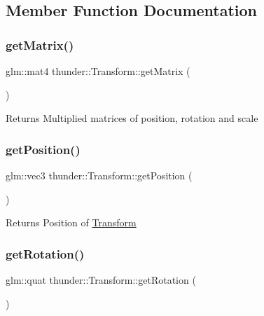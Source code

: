 \subsection{Member Function Documentation}
\mbox{\label{classthunder_1_1_transform_a9fac68be9d4eef2ae3889cc35b6c7a54}} 
\subsubsection{\texorpdfstring{get\+Matrix()}{getMatrix()}}
{\footnotesize\ttfamily glm\+::mat4 thunder\+::\+Transform\+::get\+Matrix (\begin{DoxyParamCaption}{ }\end{DoxyParamCaption})}

\begin{DoxyReturn}{Returns}
Multiplied matrices of position, rotation and scale 
\end{DoxyReturn}
\mbox{\label{classthunder_1_1_transform_ac02987b10bd5f41890a23af03318c324}} 
\subsubsection{\texorpdfstring{get\+Position()}{getPosition()}}
{\footnotesize\ttfamily glm\+::vec3 thunder\+::\+Transform\+::get\+Position (\begin{DoxyParamCaption}{ }\end{DoxyParamCaption})\hspace{0.3cm}{\ttfamily [inline]}}

\begin{DoxyReturn}{Returns}
Position of \mbox{\hyperlink{classthunder_1_1_transform}{Transform}} 
\end{DoxyReturn}
\mbox{\label{classthunder_1_1_transform_a7f846cbe6b4ce50cd5e22b8fdd51c1ad}} 
\subsubsection{\texorpdfstring{get\+Rotation()}{getRotation()}}
{\footnotesize\ttfamily glm\+::quat thunder\+::\+Transform\+::get\+Rotation (\begin{DoxyParamCaption}{ }\end{DoxyParamCaption})\hspace{0.3cm}{\ttfamily [inline]}}

